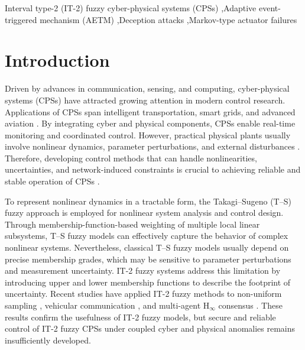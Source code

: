 \documentclass[preprint,review,fleqn,sort&compress,3p]{elsarticle}
\theoremstyle{definition} %
\theoremstyle{definition}%
\begin{document}
\begin{frontmatter}
\begin{abstract}
\end{abstract}

\begin{keyword}
	Interval type-2 (IT-2) fuzzy cyber-physical systems (CPSs) \sep Adaptive 
	event-triggered mechanism (AETM) \sep Deception attacks \sep Markov-type actuator failures 
\end{keyword}
		
\end{frontmatter}
	
\section{Introduction}%
Driven by advances in communication, sensing, and computing, cyber-physical systems (CPSs) have attracted growing attention in modern control research. Applications of CPSs span intelligent transportation, smart grids, and advanced aviation
\cite{wangMixedVehicleGroup2024,liuFalseDataInjectionAttack2023,dingSurveyModelBasedDistributed2019}.
By integrating cyber and physical components, CPSs enable real-time monitoring and coordinated control. However, practical physical plants usually involve nonlinear dynamics, parameter perturbations, and external disturbances
\cite{chenRobustAdaptiveControl2024,yuanAdaptiveControlNonlinear2024}.
Therefore, developing control methods that can handle nonlinearities, uncertainties, and network-induced constraints is crucial to achieving reliable and stable operation of CPSs
\cite{biAdaptiveDecentralizedFiniteTime2023}.

To represent nonlinear dynamics in a tractable form, the Takagi--Sugeno (T--S)
fuzzy approach \cite{wangStabilityStabilizationTS2021,wangSwitchingAsynchronousControl2024}
is employed for nonlinear system analysis and control design. Through membership-function-based weighting of multiple local linear subsystems, T--S fuzzy models can effectively capture the behavior of complex nonlinear systems. Nevertheless, classical
T--S fuzzy models usually depend on precise membership grades, which may be
sensitive to parameter perturbations and measurement uncertainty. IT-2 fuzzy systems \cite{shengAperiodicSamplingDependentEventTriggeredControl2024,liFiniteTimeDynamicEventTriggered2022}
address this limitation by introducing upper and lower membership functions to
describe the footprint of uncertainty. Recent studies have applied IT-2 fuzzy
methods to non-uniform sampling \cite{liuObserverBasedAdaptiveEventTriggered2024},
vehicular communication \cite{zhangNovelApproachVehicular2025}, and multi-agent
$\mathrm{H}_\infty$ consensus \cite{duIntervalType2Fuzzy2025}. These results confirm
the usefulness of IT-2 fuzzy models, but secure and reliable control of IT-2 fuzzy
CPSs under coupled cyber and physical anomalies remains insufficiently developed.
\end{document}
